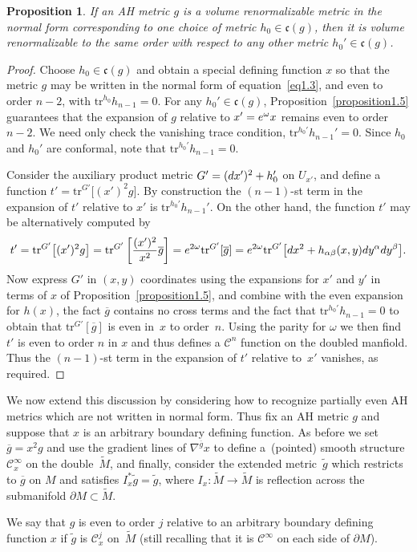 \documentclass[11pt]{article}
\numberwithin{equation}{section}
\newtheorem{Proposition}[Theorem]{Proposition}
 { \theoremstyle{definition}
\newtheorem{Definition}[Theorem]{Definition}
\newtheorem{Example}[Theorem]{Example}
\newtheorem{Remark}[Theorem]{Remark} }
\newcommand{\wt}{\widetilde}
\newcommand{\del}{\partial}
\newcommand{\olg}{\overline{g}}
\newcommand{\frakc}{\mathfrak c}
\newcommand{\calC}{\mathcal C}
\newcommand{\tr}{\mathrm{tr}}
\newcommand{\gbar}{\overline{g}}
\begin{document}
\begin{Proposition}\label{proposition1.5b}
If an AH metric $g$ is a volume renormalizable metric in the normal form corresponding to one choice of metric $h_0 \in \frakc (g)$,
then it is volume renormalizable to the same order with respect to any other metric $h_0' \in \frakc(g)$.
\end{Proposition}
\begin{proof} Choose $h_0 \in \frakc (g)$ and obtain a special defining function $x$ so that the metric $g$ may be written in the normal form of equation~\eqref{eq1.3}, and even to order $n-2$, with $\tr^{h_0} h_{n-1} = 0$. For any $h_0' \in \frakc(g)$, Proposition~\ref{proposition1.5} guarantees that the expansion of $g$ relative to $x' = {\rm e}^{\omega} x$ remains even to order $n-2$. We need only check the vanishing trace condition, $\tr^{h_0'} h_{n-1}' = 0$. Since $h_0$ and $h_0'$ are conformal, note that $\tr^{h_0'} h_{n-1} = 0$.
	
Consider the auxiliary product metric $G' = ({\rm d}x')^2 + h_0'$ on $U_{x'}$, and define a function $t' = \tr^{G'} \big[(x')^2 g\big]$. By construction the $(n-1)$-st term in the expansion of $t'$ relative to $x'$ is $\tr^{h_0'} h_{n-1}'$. On the other hand, the function $t'$ may be alternatively computed by
\begin{gather*}
	t' = \tr^{G'} \big[(x')^2 g\big] = \tr^{G'} \left[ \frac{(x')^2}{x^2} \gbar \right]
	= {\rm e}^{2\omega} \tr^{G'} [ \gbar ] = {\rm e}^{2\omega} \tr^{G'} \big[ {\rm d}x^2 + h_{\alpha \beta}(x,y) {\rm d}y^{\alpha} {\rm d}y^{\beta} \big].
\end{gather*}
Now express $G'$ in $(x,y)$ coordinates using the expansions for $x'$ and $y'$ in terms of $x$ of Proposition~\ref{proposition1.5}, and combine with the even expansion for $h(x)$, the fact $\gbar$ contains no cross terms and the fact that $\tr^{h_0'} h_{n-1} = 0$ to obtain that $\tr^{G'} [ \gbar ]$ is even in~$x$ to order~$n$. Using the parity for $\omega$ we then find $t'$ is even to order $n$ in $x$ and thus defines a $\calC^n$ function on the doubled manfiold. Thus the $(n-1)$-st term in the expansion of $t'$ relative to~$x'$ vanishes, as required.
\end{proof}

We now extend this discussion by considering how to recognize partially even AH metrics which are not written in
normal form. Thus fix an AH metric $g$ and suppose that $x$ is an arbitrary boundary defining function. As before
we set $\olg = x^2 g$ and use the gradient lines of $\nabla^{\olg} x$ to define a~(pointed) smooth structure $\calC^{\infty}_x$ on the
double~$\wt{M}$, and finally, consider the extended metric~$\tilde{g}$ which restricts to $\olg$ on $M$ and
satisfies $I_x^* \tilde{g} = \tilde{g}$, where $I_x\colon \wt{M} \to \wt{M}$ is reflection across the submanifold $\del M \subset \wt{M}$.
\begin{Definition}\label{definition1.6} \label{defn-even}
We say that $g$ is even to order $j$ relative to an arbitrary boundary defining function $x$ if $\tilde{g}$ is $\calC^{j}_x$ on~$\wt{M}$ (still recalling that it is $\calC^\infty$ on each side of $\del M$).
\end{Definition}
\end{document}
